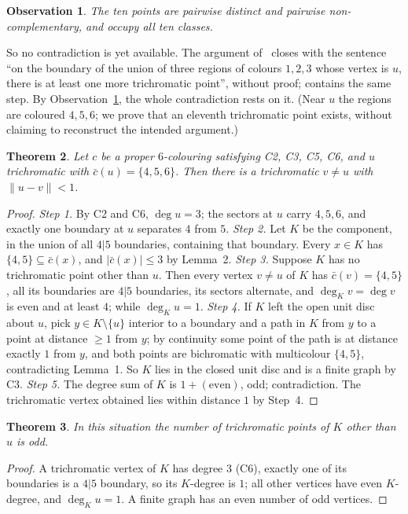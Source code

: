 \documentclass[11pt,a4paper]{amsart}
\newtheorem{theorem}{Theorem}[section]
\newtheorem{observation}[theorem]{Observation}
\theoremstyle{remark}
\begin{document}
\begin{observation}\label{obs:ten}
The ten points are pairwise distinct and pairwise non-complementary, and occupy all ten classes.
\end{observation}

So no contradiction is yet available. The argument of~\cite{SV26} closes with the sentence ``on the boundary of the union of three regions of colours $1,2,3$ whose vertex is $u$, there is at least one more trichromatic point'', without proof; \cite[Lemma 6.1]{Vo24} contains the same step. By Observation~\ref{obs:ten}, the whole contradiction rests on it. (Near $u$ the regions are coloured $4,5,6$; we prove that an eleventh trichromatic point exists, without claiming to reconstruct the intended argument.)

\begin{theorem}\label{thm:eleventh}
Let $c$ be a proper $6$-colouring satisfying C2, C3, C5, C6, and $u$ trichromatic with $\bar c(u)=\{4,5,6\}$. Then there is a trichromatic $v\ne u$ with $\|u-v\|<1$.
\end{theorem}

\begin{proof}
\emph{Step 1.} By C2 and C6, $\deg u=3$; the sectors at $u$ carry $4,5,6$, and exactly one boundary at $u$ separates $4$ from $5$.
\emph{Step 2.} Let $K$ be the component, in the union of all $4|5$ boundaries, containing that boundary. Every $x\in K$ has $\{4,5\}\subseteq\bar c(x)$, and $|\bar c(x)|\le3$ by Lemma~2.
\emph{Step 3.} Suppose $K$ has no trichromatic point other than $u$. Then every vertex $v\ne u$ of $K$ has $\bar c(v)=\{4,5\}$, all its boundaries are $4|5$ boundaries, its sectors alternate, and $\deg_K v=\deg v$ is even and at least $4$; while $\deg_K u=1$.
\emph{Step 4.} If $K$ left the open unit disc about $u$, pick $y\in K\setminus\{u\}$ interior to a boundary and a path in $K$ from $y$ to a point at distance $\ge1$ from $y$; by continuity some point of the path is at distance exactly $1$ from $y$, and both points are bichromatic with multicolour $\{4,5\}$, contradicting Lemma~1. So $K$ lies in the closed unit disc and is a finite graph by C3.
\emph{Step 5.} The degree sum of $K$ is $1+(\text{even})$, odd; contradiction. The trichromatic vertex obtained lies within distance $1$ by Step~4.
\end{proof}

\begin{theorem}\label{thm:odd}
In this situation the number of trichromatic points of $K$ other than $u$ is odd.
\end{theorem}
\begin{proof}
A trichromatic vertex of $K$ has degree $3$ (C6), exactly one of its boundaries is a $4|5$ boundary, so its $K$-degree is $1$; all other vertices have even $K$-degree, and $\deg_K u=1$. A finite graph has an even number of odd vertices.
\end{proof}
\end{document}

